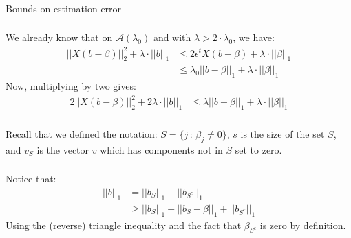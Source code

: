 \begin{frame}[fragile] \frametitle{}

\begin{flushright}
{\color{yaleblue}\sc\fontsize{1cm}{0cm}\selectfont Bounds on estimation error}
\end{flushright}

\end{frame}

\begin{frame}[fragile] \frametitle{}

We already know that on $\mathcal{A}(\lambda_0)$ and with $\lambda > 2 \cdot \lambda_0$, we have:
\begin{align*}
|| X (b - \beta) ||_2^2 + \lambda \cdot || b ||_1 &\leq 2 \epsilon^t X (b - \beta) + \lambda \cdot || \beta ||_1 \\
&\leq \lambda_0 || b - \beta ||_1 + \lambda \cdot || \beta ||_1
\end{align*}
\pause Now, multiplying by two gives:
\begin{align*}
2 || X (b - \beta) ||_2^2 + 2 \lambda \cdot || b ||_1
&\leq \lambda || b - \beta ||_1 + \lambda \cdot || \beta ||_1
\end{align*}

\end{frame}

\begin{frame}[fragile] \frametitle{}

Recall that we defined the notation: $S = \{j \, : \, \beta_j \neq 0\}$, $s$
is the size of the set $S$, and $v_{S}$ is the vector
$v$ which has components not in $S$ set to zero.

\end{frame}

\begin{frame}[fragile] \frametitle{}

Notice that:
\begin{align*}
|| b ||_1 &= || b_S ||_1 + || b_{S^c} ||_1 \\
&\geq || b_S ||_1 - || b_S - \beta ||_1 + || b_{S^c} ||_1
\end{align*}
Using the (reverse) triangle inequality and the fact that $\beta_{S^c}$ is zero
by definition.

\end{frame}

